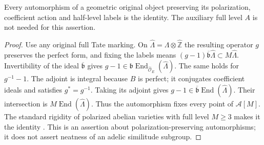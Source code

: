 \begin{lemma}
\label{lem:pel-half-level-automorphisms}
Every automorphism of a geometric original object preserving its
polarization, coefficient action and half-level labels is the identity.
The auxiliary full level $A$ is not needed for this assertion.
\end{lemma}
\begin{proof}
Use any original full Tate marking. On
$\widehat\Lambda=\Lambda\otimes\widehat{\mathbb Z}$ the resulting
operator $g$ preserves the perfect form, and fixing the labels means
$(g-1)\overline{\mathfrak b}\widehat\Lambda\subset M\widehat\Lambda$.
Invertibility of the ideal $\overline{\mathfrak b}$ gives
$g-1\in\mathfrak b\operatorname{End}_{\widehat{\mathcal O}_E}
(\widehat\Lambda)$. The same holds for $g^{-1}-1$.
The adjoint is integral because $B$ is perfect; it conjugates
coefficient ideals and satisfies $g^*=g^{-1}$. Taking its adjoint
gives $g-1\in\overline{\mathfrak b}\operatorname{End}(\widehat\Lambda)$.
Their intersection is $M\operatorname{End}(\widehat\Lambda)$.
Thus the automorphism fixes every point of $\mathcal A[M]$.
The standard rigidity of polarized abelian varieties with full level
$M\geq3$ makes it the identity
\cite[Lemma 2.3.3.1]{generic-pel-lan}.
This is an assertion about polarization-preserving automorphisms;
it does not assert neatness of an adelic similitude subgroup.
\end{proof}

